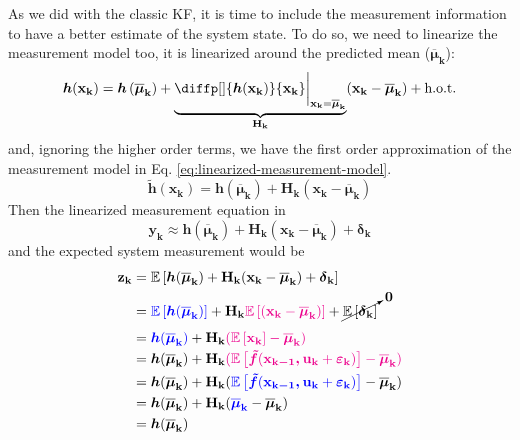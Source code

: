 \documentclass[12pt]{article}
\newcommand{\bvec}[1]{\boldsymbol{\mathbf{#1}}} %
\newcommand{\mat}[1]{\boldsymbol{\mathbf{#1}}}
\newcommand{\brac}[1]{\left[#1\right]} %
\newcommand{\parentheses}[1]{\left(#1\right)}
\newcommand{\mb}[1]{{\boldsymbol{#1}}} %
\newcommand{\expv}[1]{\mathbb{E}\brac{#1}} %
\newcommand{\hot}{\text{h.o.t.}}
\newcommand{\blue}[1]{\color{blue}#1\color{black}}
\newcommand{\magenta}[1]{\color{magenta}#1\color{black}}
\begin{document}
As we did with the classic KF, it is time to include the measurement information 
to have a better estimate of the system state. To do so, we need to linearize 
the measurement model too, it is linearized around the predicted mean 
($\bvec{\overline{\mu}_k}$):
\begin{equation*}
    \mb{h}(\bvec{x_k}) = \mb{h}\parentheses{\bvec{\overline{\mu}_k}} + 
    \underbrace{\diffp[]{\mb{h}(\bvec{x_k})}{\bvec{x_k}}
    \bigg\lvert_{\bvec{x_k}=\bvec{\overline{\mu}_k}}}_{\mat{H_k}}
    (\bvec{x_k} - \bvec{\overline{\mu}_k}) + \hot
\end{equation*}
and, ignoring the higher order terms, we have the first order approximation of the measurement model in Eq. \ref{eq:linearized-measurement-model}.
\begin{equation}
    \mb{\tilde{h}}(\bvec{x_k}) = \mb{h}(\bvec{\overline{\mu}_k}) + \mat{H_k} (\bvec{x_k} - \bvec{\overline{\mu}_k})
    \label{eq:linearized-measurement-model} 
\end{equation}
Then the linearized measurement equation in
\begin{equation}
    \bvec{y_k} \approx \mb{h}(\bvec{\overline{\mu}_k}) + \mat{H_k}(\bvec{x_k} - \bvec{\overline{\mu}_k}) + \mb{\delta}_\mathbf{k}
\end{equation}
and the expected system measurement would be
\begin{equation}
\begin{aligned}
    \bvec{z_k} &= \expv{\mb{h}(\bvec{\overline{\mu}_k}) + \mat{H_k}(\bvec{x_k} - \bvec{\overline{\mu}_k}) + \mb{\delta}_\mathbf{k}}\\
    &= \blue{\expv{\mb{h}(\bvec{\overline{\mu}_k})}} + \mat{H_k}\magenta{\expv{(\bvec{x_k} - \bvec{\overline{\mu}_k})}} + \cancelto{\mat{0}}{\expv{\mb{\delta}_\mathbf{k}}}\\
    &= \blue{\mb{h}(\bvec{\overline{\mu}_k})} + \mat{H_k}\magenta{(\expv{\bvec{x_k}} - \bvec{\overline{\mu}_k})}\\
    &= \mb{h}(\bvec{\overline{\mu}_k}) + \mat{H_k}\magenta{(\expv{
    \mb{\tilde{f}}(\bvec{x_{k-1}, u_k} + \bvec{\varepsilon_k})} 
    - \bvec{\overline{\mu}_k})}\\
    &= \mb{h}(\bvec{\overline{\mu}_k}) + \mat{H_k}(\blue{\expv{
    \mb{\tilde{f}}(\bvec{x_{k-1}, u_k} + \bvec{\varepsilon_k})}} 
    - \bvec{\overline{\mu}_k})\\
    &= \mb{h}(\bvec{\overline{\mu}_k}) + \mat{H_k}(
        \blue{\bvec{\overline{\mu}_k}} - \bvec{\overline{\mu}_k})\\
    &= \mb{h}(\bvec{\overline{\mu}_k}) 
\end{aligned}
\end{equation}
\end{document}
